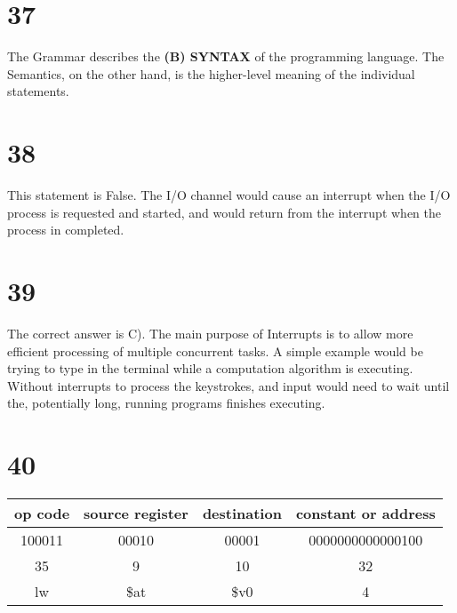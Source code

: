 \documentclass[a4paper,11pt]{article}
\begin{document}

\section*{37}
The Grammar describes the {\bf (B) SYNTAX} of the programming language.  The Semantics, on the other hand, is the higher-level meaning of the individual statements.  


\section*{38}
This statement is False.  The I/O channel would cause an interrupt when the I/O process is requested and started, and would return from the interrupt when the process in completed.


\section*{39}
The correct answer is C).   The main purpose of Interrupts is to allow more efficient processing of multiple concurrent tasks.  A simple example would be trying to type in the terminal while a computation algorithm is executing.  Without interrupts to process the keystrokes, and input would need to wait until the, potentially long, running programs finishes executing. 


\section*{40}
 \begin{tabular}{| c | c | c | c |}
  \hline	
  op code & source register & destination & constant or address\\  \hline  		
  100011 & 00010 & 00001 & 0000000000000100 \\ \hline
  35 & 9 & 10 & 32  \\ \hline
  lw & \$at & \$v0 & 4 \\ \hline
\end{tabular} \\


\end{document}
